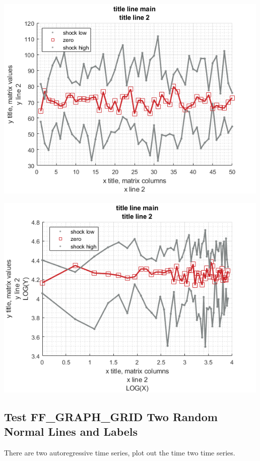 \documentclass[
]{book}
\begin{document}
\includegraphics[width=5.20833in,height=\textheight]{img/fx_graph_grid_images/figure_2.png}

\includegraphics[width=5.20833in,height=\textheight]{img/fx_graph_grid_images/figure_3.png}

\hypertarget{test-ff_graph_grid-two-random-normal-lines-and-labels}{%
\subsection{Test FF\_GRAPH\_GRID Two Random Normal Lines and Labels}\label{test-ff_graph_grid-two-random-normal-lines-and-labels}}

There are two autoregressive time series, plot out the time two time
series.
\end{document}
